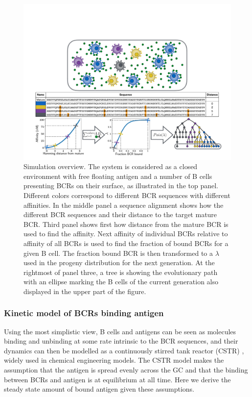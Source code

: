 \begin{figure}[ht!]
    \centering
    \includegraphics[width=1\textwidth]{figures/simulation_figure.pdf}
    \caption{
        \label{fig:simulation_figure}
        Simulation overview.
        The system is considered as a closed environment with free floating antigen and a number of B cells presenting BCRs on their surface, as illustrated in the top panel.
        Different colors correspond to different BCR sequences with different affinities.
        In the middle panel a sequence alignment shows how the different BCR sequences and their distance to the target mature BCR.
        Third panel shows first how distance from the mature BCR is used to find the affinity.
        Next affinity of individual BCRs relative to affinity of all BCRs is used to find the fraction of bound BCRs for a given B cell.
        The fraction bound BCR is then transformed to a $\lambda$ used in the progeny distribution for the next generation.
        At the rightmost of panel three, a tree is showing the evolutionary path with an ellipse marking the B cells of the current generation also displayed in the upper part of the figure.
    }
\end{figure}







\subsubsection{Kinetic model of BCRs binding antigen}
Using the most simplistic view, B cells and antigens can be seen as molecules binding and unbinding at some rate intrinsic to the BCR sequences, and their dynamics can then be modelled as a continuously stirred tank reactor (CSTR) \cite{CSTR}, widely used in chemical engineering models.
The CSTR model makes the assumption that the antigen is spread evenly across the GC and that the binding between BCRs and antigen is at equilibrium at all time.
Here we derive the steady state amount of bound antigen given these assumptions.

